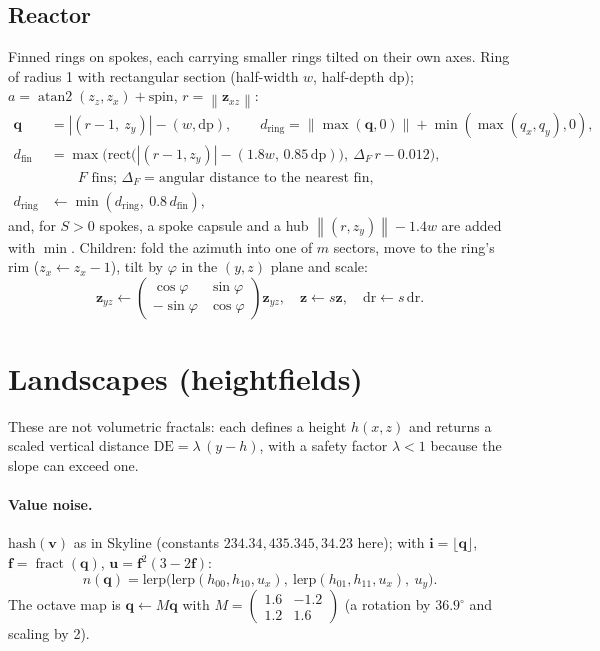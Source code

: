 \documentclass[10pt,a4paper]{article}
\newcommand{\vv}[1]{\mathbf{#1}}
\newcommand{\abs}[1]{\left|#1\right|}
\newcommand{\norm}[1]{\left\lVert#1\right\rVert}
\newcommand{\fract}{\operatorname{fract}}
\newcommand{\atantwo}{\operatorname{atan2}}
\newcommand{\DE}{\mathrm{DE}}
\begin{document}
\subsection{Reactor}
Finned rings on spokes, each carrying smaller rings tilted on their own axes. Ring of radius 1 with rectangular section (half-width $w$, half-depth $\mathrm{dp}$); $a=\atantwo(z_z,z_x)+\text{spin}$, $r=\norm{\vv z_{xz}}$:
\begin{align}
\vv q&=\abs{(r-1,\ z_y)}-(w,\mathrm{dp}),\qquad d_{\text{ring}}=\norm{\max(\vv q,0)}+\min(\max(q_x,q_y),0),\\
d_{\text{fin}}&=\max\!\Big(\mathrm{rect}\big(\abs{(r-1,z_y)}-(1.8w,\,0.85\,\mathrm{dp})\big),\ \Delta_F\,r-0.012\Big),\\
&\qquad F\text{ fins; }\Delta_F=\text{angular distance to the nearest fin},\\
d_{\text{ring}}&\leftarrow\min(d_{\text{ring}},\ 0.8\,d_{\text{fin}}),
\end{align}
and, for $S>0$ spokes, a spoke capsule and a hub $\norm{(r,z_y)}-1.4w$ are added with $\min$. Children: fold the azimuth into one of $m$ sectors, move to the ring's rim ($z_x\leftarrow z_x-1$), tilt by $\varphi$ in the $(y,z)$ plane and scale:
\begin{equation}
\vv z_{yz}\leftarrow\begin{pmatrix}\cos\varphi&\sin\varphi\\-\sin\varphi&\cos\varphi\end{pmatrix}\vv z_{yz},\quad\vv z\leftarrow s\vv z,\quad\mathrm{dr}\leftarrow s\,\mathrm{dr}.
\end{equation}


\section{Landscapes (heightfields)}
These are not volumetric fractals: each defines a height $h(x,z)$ and returns a scaled vertical distance $\DE=\lambda\,(y-h)$, with a safety factor $\lambda<1$ because the slope can exceed one.

\paragraph{Value noise.} $\mathrm{hash}(\vv v)$ as in Skyline (constants $234.34,435.345,34.23$ here); with $\vv i=\lfloor\vv q\rfloor$, $\vv f=\fract(\vv q)$, $\vv u=\vv f^2(3-2\vv f)$:
\begin{equation}n(\vv q)=\mathrm{lerp}\big(\mathrm{lerp}(h_{00},h_{10},u_x),\ \mathrm{lerp}(h_{01},h_{11},u_x),\ u_y\big).\end{equation}
The octave map is $\vv q\leftarrow M\vv q$ with $M=\begin{pmatrix}1.6&-1.2\\1.2&1.6\end{pmatrix}$ (a rotation by $36.9^\circ$ and scaling by 2).
\end{document}

